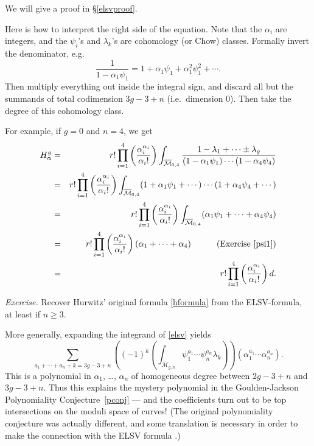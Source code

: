 \documentclass[12pt,letterpaper]{amsart}
\newcommand{\cm}{{\mathcal{M}}}
\newcommand{\cmbar}{\overline{\cm}}
\newcommand{\al}{\alpha}
\newcommand{\la}{\lambda}
\begin{document}
{We will give a proof in \S \ref{elsvproof}.

Here is how to interpret the right side of the equation.
Note that the $\al_i$ are integers, and the $\psi_i$'s and $\la_k$'s
are cohomology (or Chow) classes.
Formally invert the denominator, e.g.\
$$
\frac 1 {1 - \al_1 \psi_1}= 1 + \al_1 \psi_1 + \al_1^2 \psi_1^2 +
\cdots.$$ Then multiply everything out inside the integral sign, and
discard all but the summands of total codimension $3g-3+n$ (i.e.\
dimension $0$).  Then take the degree of this cohomology class.

For example, if $g=0$ and $n=4$, we get
\begin{eqnarray*}
H^g_{\al} &=&
 r! 
\prod_{i=1}^4  
\left(  \frac{ \al_i^{\al_i}}
{ \al_i!} \right)
\int_{\cmbar_{0,4}} \frac { 1 - \la_1 + \cdots \pm \la_g}
{ ( 1 - \al_1 \psi_1) \cdots (1 - \al_4 \psi_4)}\\
&=& 
r! 
\prod_{i=1}^4  
\left(  \frac{ \al_i^{\al_i}}
{ \al_i!} \right)
\int_{\cmbar_{0,4}} 
 ( 1 + \al_1 \psi_1+ \cdots ) \cdots (1 + \al_4 \psi_4 + \cdots)\\
&=&
r! 
\prod_{i=1}^4  
\left(  \frac{ \al_i^{\al_i}}
{ \al_i!} \right)
\int_{\cmbar_{0,4}} 
 ( \al_1 \psi_1+ \cdots + \al_4 \psi_4 ) \\
&=&
r! 
\prod_{i=1}^4  
\left(  \frac{ \al_i^{\al_i}}
{ \al_i!} \right)
(\al_1 + \cdots + \al_4)  \quad \quad \quad \text{(Exercise~\ref{psi1})}\\
&=&
r! 
\prod_{i=1}^4  
\left(  \frac{ \al_i^{\al_i}}
{ \al_i!} \right) d.
\end{eqnarray*}

\noindent
{\em Exercise.}  Recover Hurwitz' original formula \eqref{hformula} from the
ELSV-formula, at least if $n\geq 3$.

More generally, expanding the integrand  of \eqref{elsv} yields
\begin{equation}\label{Pgn}
 \sum_{a_1 + \cdots + a_n + k = 3g-3+n} \left( (-1)^k  
\left( \int_{\cmbar_{g,n}} \psi_1^{a_1} 
  \cdots \psi_n^{a_n} \la_k\right) \right)
\left( \al_1^{a_1} \cdots \al_n^{a_n} \right).
\end{equation}
This is a polynomial in $\al_1$, \dots, $\al_n$ of homogeneous
degree between
$2g-3+n$ and $3g-3+n$.
Thus this explains the mystery polynomial in the Goulden-Jackson Polynomiality
Conjecture~\ref{pconj} --- and the coefficients turn out to be top intersections
on the moduli space of curves!  (The original polynomiality conjecture
was actually different, and some translation is necessary in order to make
the connection with the ELSV formula \cite{gjv1}.)

}
\end{document}
